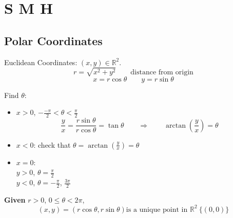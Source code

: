 \documentclass[12pt]{article}
\theoremstyle{plain}
\newcommand{\mR}{{\mathbb{R}}}
\begin{document}
\section{S M H}

\subsection{Polar Coordinates}
Euclidean Coordinates: $(x,y) \in \mR^2$. 
\[
	r = \sqrt{x^2+y^2} \qquad \text{distance from origin}
\]
\[
	x = r\cos \theta \qquad y = r\sin \theta
\]

Find $\theta$:
\begin{itemize}
	\item  $x > 0$, $-\frac{-\pi}2 < \theta < \frac{\pi}2$
	\[
		\frac yx = \frac{r\sin \theta}{r\cos \theta} = \tan \theta
		\qquad \Rightarrow \qquad 
		\arctan(\frac yx) = \theta
	\]
	\item $x < 0$: check that $\theta = \arctan (\frac yx)= \theta$
	\item $x = 0$: \\
		$y > 0$, $\theta = \frac{\pi}2$\\
		$y < 0$, $\theta = -\frac{\pi}2$, $\frac{3\pi}2$
\end{itemize}

\textbf{Given} $r > 0$, $0 \leq \theta < 2\pi$,
\[
	(x, y) = (r\cos \theta, r\sin\theta) \text{is a unique point
	in } \mR^2\ \{(0,0)\}
\]
\end{document}
